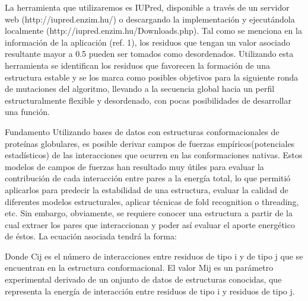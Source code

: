 La herramienta que utilizaremos es IUPred, disponible a través de un servidor web (http://iupred.enzim.hu/) o descargando la implementación 
y ejecutándola localmente (http://iupred.enzim.hu/Downloads.php).   
Tal como se menciona en la información de la aplicación (ref. 1), los residuos que tengan un valor asociado resultante mayor a 0.5 pueden ser tomados como desordenados.
Utilizando esta herramienta se identifican los residuos que favorecen la formación de una estructura estable 
y se los marca como posibles objetivos para la siguiente ronda de mutaciones del algoritmo, llevando a la secuencia 
global hacia un perfil estructuralmente flexible y desordenado, con pocas posibilidades de desarrollar una función.


Fundamento
Utilizando bases de datos con estructuras conformacionales de proteínas globulares, 
es posible derivar campos de fuerzas empíricos(potenciales estadísticos) de las interacciones que ocurren en las conformaciones nativas. 
Estos modelos de campos de fuerzas han resultado muy útiles para evaluar la contribución de cada interacción entre pares a la energía total,
lo que permitió aplicarlos para predecir la estabilidad de una estructura, evaluar la calidad de diferentes modelos estructurales, aplicar técnicas de fold recognition o threading, etc. 
Sin embargo, obviamente, se requiere conocer una estructura a partir de la cual extraer los pares que interaccionan y poder así evaluar el aporte energético de éstos. 
La ecuación asociada tendrá la forma:





Donde Cij es el número de interacciones entre residuos de tipo i y de tipo j que se encuentran en la estructura conformacional. 
El valor Mij es un parámetro experimental derivado de un onjunto de datos de estructuras conocidas, que representa la energía de interacción entre residuos de tipo i y residuos de tipo j.

